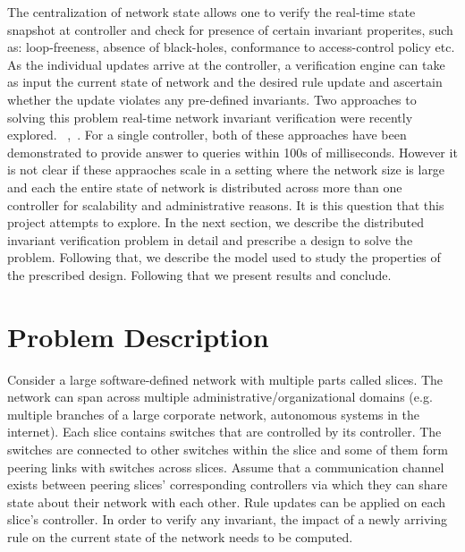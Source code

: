 \documentclass[conference]{IEEEtran}
\begin{document}
The centralization of network state allows one to verify the real-time state snapshot at controller and check for presence of certain invariant properites, such as: loop-freeness, absence of black-holes, conformance to access-control policy etc. As the individual updates arrive at the controller, a verification engine can take as input the current state of network and the desired rule update and ascertain whether the update violates any pre-defined invariants. Two approaches to solving this problem real-time network invariant verification were recently explored. ~\cite{veriflownsdi},~\cite{netplumber}. For a single controller, both of these approaches have been demonstrated to provide answer to queries within 100s of milliseconds. However it is not clear if these appraoches scale in a setting where the network size is large and each the entire state of network is distributed across more than one controller for scalability and administrative reasons. It is this question that this project attempts to explore. 
In the next section, we describe the distributed invariant verification problem in detail and prescribe a design to solve the problem. Following that, we describe the model used to study the properties of the prescribed design. Following that we present results and conclude. 

\section{Problem Description}

Consider a large software-defined network with multiple parts called slices. The network can span across multiple administrative/organizational domains (e.g. multiple branches of a large corporate network, autonomous systems in the internet). Each slice contains switches that are controlled by its controller. The switches are connected to other switches within the slice and some of them form peering links with switches across slices. Assume that a communication channel exists between peering slices' corresponding controllers via which they can share state about their network with each other. Rule updates can be applied on each slice's controller. In order to verify any invariant, the impact of a newly arriving rule on the current state of the network needs to be computed. 
\end{document}
